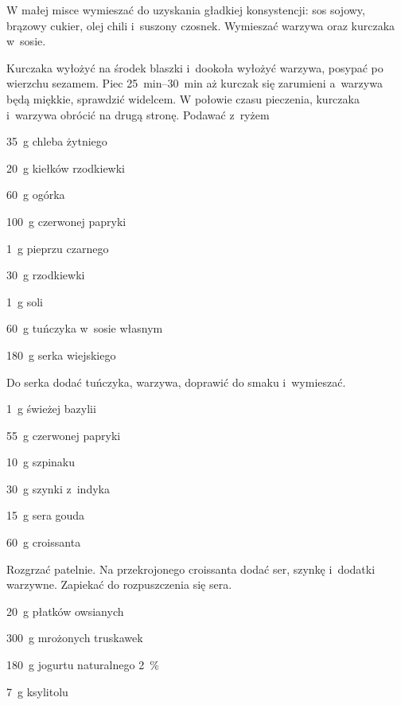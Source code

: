 \documentclass[../kucharek.tex]{subfiles}
\begin{document}
W małej misce wymieszać do uzyskania gładkiej konsystencji: sos sojowy, brązowy
cukier, olej chili i~suszony czosnek. Wymieszać warzywa oraz kurczaka w~sosie.

Kurczaka wyłożyć na środek blaszki i~dookoła wyłożyć warzywa, posypać po
wierzchu sezamem. Piec \qtyrange{25}{30}{\minute} aż kurczak się zarumieni
a~warzywa będą miękkie, sprawdzić widelcem. W połowie czasu pieczenia, kurczaka
i~warzywa obrócić na drugą stronę. Podawać z~ryżem


\begin{Ingred}
    \item \qty{35}{\gram} chleba żytniego
    \item \qty{20}{\gram} kiełków rzodkiewki
    \item \qty{60}{\gram} ogórka
    \item \qty{100}{\gram} czerwonej papryki
    \item \qty{1}{\gram} pieprzu czarnego
    \item \qty{30}{\gram} rzodkiewki
    \item \qty{1}{\gram} soli
    \item \qty{60}{\gram} tuńczyka w~sosie własnym
    \item \qty{180}{\gram} serka wiejskiego
\end{Ingred}

Do serka dodać tuńczyka, warzywa, doprawić do smaku i~wymieszać.


\begin{Ingred}
    \item \qty{1}{\gram} świeżej bazylii
    \item \qty{55}{\gram} czerwonej papryki
    \item \qty{10}{\gram} szpinaku
    \item \qty{30}{\gram} szynki z~indyka
    \item \qty{15}{\gram} sera gouda
    \item \qty{60}{\gram} croissanta
\end{Ingred}

Rozgrzać patelnie. Na przekrojonego croissanta dodać ser, szynkę i~dodatki
warzywne. Zapiekać do rozpuszczenia się sera.


\begin{Ingred}
    \item \qty{20}{\gram} płatków owsianych
    \item \qty{300}{\gram} mrożonych truskawek
    \item \qty{180}{\gram} jogurtu naturalnego \qty{2}{\percent}
    \item \qty{7}{\gram} ksylitolu
\end{Ingred}
\end{document}
